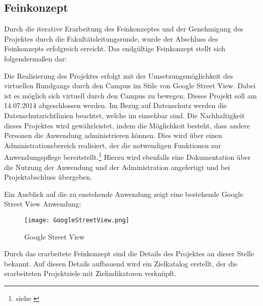 \subsection{Feinkonzept}
\label{sec:Feinkonzept}

Durch die iterative Erarbeitung des Feinkonzeptes und der Genehmigung des
Projektes durch die Fakultätsleitungsrunde, wurde der Abschluss des Feinkonzepts
erfolgreich erreicht. Das endgültige Feinkonzept stellt sich folgendermaßen dar:

Die Realisierung des Projektes erfolgt mit der Umsetzungsmöglichkeit des
virtuellen Rundgangs durch den Campus im Stile von Google Street View. Dabei ist
es möglich sich virtuell durch den Campus zu bewegen. Dieses Projekt soll am
14.07.2014 abgeschlossen werden. Im Bezug auf Datenschutz werden die
Datenschutzrichtlinien beachtet, welche im 
einsehbar sind. Die Nachhaltigkeit dieses Projektes wird gewährleistet, indem die Möglichkeit
besteht, dass andere Personen die Anwendung administrieren können. Dies wird über
einen Administrationsbereich realisiert, der die notwendigen Funktionen zur
Anwendungspflege bereitstellt.\footnote{siehe \citet{lastenheft2013}} Hierzu
wird ebenfalls eine Dokumentation über die Nutzung der Anwendung und der
Administration angefertigt und bei Projektabschluss übergeben.

Ein Ausblick auf die zu enstehende Anwendung zeigt eine bestehende 
Google Street View Anwendung:

\clearpage
\begin{figure}[htb] 
\centering
\texttt{[image: GoogleStreetView.png]}
\caption[Google Street View]{Google Street View\protect\footnotemark}
\label{fig:GoogleStreetView}
\end{figure}

Durch das erarbeitete Feinkonzept sind die Details des Projektes an dieser Stelle bekannt.
Auf diesen Details aufbauend wird ein Zielkatalog erstellt, der die erarbeiteten Projektziele
mit Zielindikatoren verknüpft.